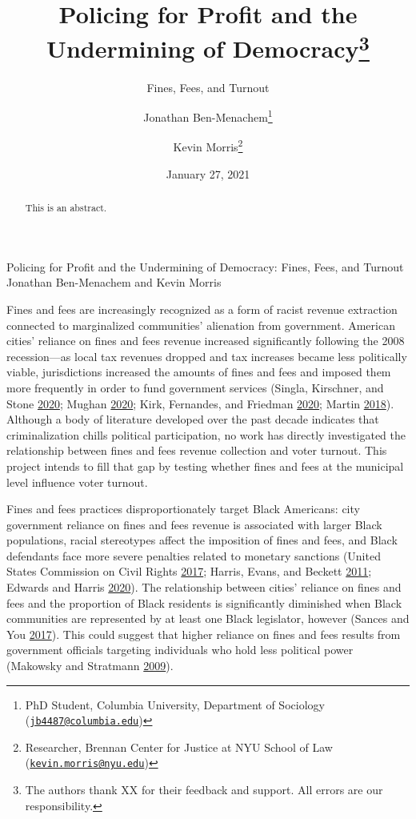 \documentclass[
  12pt,
]{article}
\title{Policing for Profit and the Undermining of Democracy\thanks{The authors thank XX for their feedback and support. All errors are our responsibility.}}
\subtitle{Fines, Fees, and Turnout}
\author{Jonathan Ben-Menachem\footnote{PhD Student, Columbia University, Department of Sociology (\href{mailto:jb4487@columbia.edu}{\nolinkurl{jb4487@columbia.edu}})} \and Kevin Morris\footnote{Researcher, Brennan Center for Justice at NYU School of Law (\href{mailto:kevin.morris@nyu.edu}{\nolinkurl{kevin.morris@nyu.edu}})}}
\date{January 27, 2021}
\begin{document}
\maketitle
\begin{abstract}
This is an abstract.
\end{abstract}

\pagebreak

\begin{center}
Policing for Profit and the Undermining of Democracy: Fines, Fees, and Turnout \\
Jonathan Ben-Menachem and Kevin Morris
\end{center}

Fines and fees are increasingly recognized as a form of racist revenue extraction connected to marginalized communities' alienation from government. American cities' reliance on fines and fees revenue increased significantly following the 2008 recession---as local tax revenues dropped and tax increases became less politically viable, jurisdictions increased the amounts of fines and fees and imposed them more frequently in order to fund government services (Singla, Kirschner, and Stone \protect\hyperlink{ref-Singla2020}{2020}; Mughan \protect\hyperlink{ref-Mughan2020}{2020}; Kirk, Fernandes, and Friedman \protect\hyperlink{ref-Kirk2020}{2020}; Martin \protect\hyperlink{ref-Martin2018}{2018}). Although a body of literature developed over the past decade indicates that criminalization chills political participation, no work has directly investigated the relationship between fines and fees revenue collection and voter turnout. This project intends to fill that gap by testing whether fines and fees at the municipal level influence voter turnout.

Fines and fees practices disproportionately target Black Americans: city government reliance on fines and fees revenue is associated with larger Black populations, racial stereotypes affect the imposition of fines and fees, and Black defendants face more severe penalties related to monetary sanctions (United States Commission on Civil Rights \protect\hyperlink{ref-UnitedStatesCommissiononCivilRights2017}{2017}; Harris, Evans, and Beckett \protect\hyperlink{ref-Harris2011}{2011}; Edwards and Harris \protect\hyperlink{ref-Edwards2020}{2020}). The relationship between cities' reliance on fines and fees and the proportion of Black residents is significantly diminished when Black communities are represented by at least one Black legislator, however (Sances and You \protect\hyperlink{ref-Sances2017}{2017}). This could suggest that higher reliance on fines and fees results from government officials targeting individuals who hold less political power (Makowsky and Stratmann \protect\hyperlink{ref-Makowsky2009}{2009}).
\end{document}
